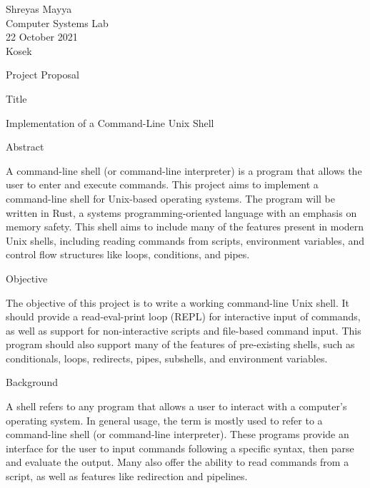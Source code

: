\documentclass[12pt]{article}
\begin{document}
		\begin{flushleft}
			
			Shreyas Mayya\\
			Computer Systems Lab\\
			22 October 2021\\
			Kosek\\
			
			
			\begin{center}
				{\huge Project Proposal\par}
			\end{center}
			
			
			\setlength{\parindent}{0pt}
			
			{\large Title\par}
			\noindent Implementation of a Command-Line Unix Shell
			
			{\large Abstract\par}
			\indent A command-line shell (or command-line interpreter) is a program that allows the user to enter and execute commands. This project aims to implement a command-line shell for Unix-based operating systems. The program will be written in Rust, a systems programming-oriented language with an emphasis on memory safety. This shell aims to include many of the features present in modern Unix shells, including reading commands from scripts, environment variables, and control flow structures like loops, conditions, and pipes.
			
			{\large Objective\par}
			The objective of this project is to write a working command-line Unix shell. It should provide a read-eval-print loop (REPL) for interactive input of commands, as well as support for non-interactive scripts and file-based command input. This program should also support many of the features of pre-existing shells, such as conditionals, loops, redirects, pipes, subshells, and environment variables.
			
			{\large Background\par}
			A shell refers to any program that allows a user to interact with a computer’s operating system. In general usage, the term is mostly used to refer to a command-line shell (or command-line interpreter). These programs provide an interface for the user to input commands following a specific syntax, then parse and evaluate the output. Many also offer the ability to read commands from a script, as well as features like redirection and pipelines.


\end{flushleft}
\end{document}
